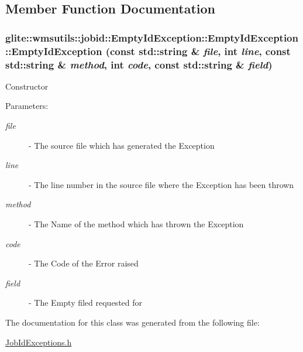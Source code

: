 \subsection{Member Function Documentation}
\hypertarget{classglite_1_1wmsutils_1_1jobid_1_1EmptyIdException_a0}{
\subsubsection[EmptyIdException::EmptyIdException]{\setlength{\rightskip}{0pt plus 5cm}glite::wmsutils::jobid::Empty\-Id\-Exception::Empty\-Id\-Exception::Empty\-Id\-Exception (const std::string \& {\em file}, int {\em line}, const std::string \& {\em method}, int {\em code}, const std::string \& {\em field})}}
\label{classglite_1_1wmsutils_1_1jobid_1_1EmptyIdException_a0}


Constructor \begin{Desc}
\item[Parameters:]
\begin{description}
\item[{\em file}]- The source file which has generated the Exception \item[{\em line}]- The line number in the source file where the Exception has been thrown \item[{\em method}]- The Name of the method which has thrown the Exception \item[{\em code}]- The Code of the Error raised \item[{\em field}]- The Empty filed requested for \end{description}
\end{Desc}


The documentation for this class was generated from the following file:\begin{CompactItemize}
\item 
\hyperlink{JobIdExceptions_8h}{Job\-Id\-Exceptions.h}\end{CompactItemize}
